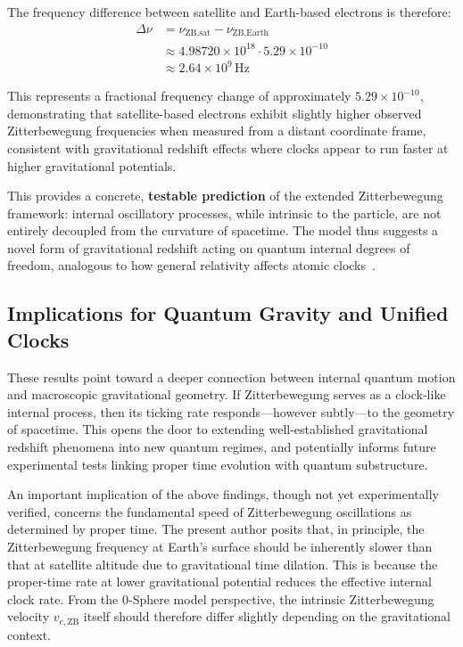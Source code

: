 \documentclass[%
 reprint,
 amsmath,amssymb,
 aps,
]{revtex4-1}
\numberwithin{equation}{section}%
\begin{document}
The frequency difference between satellite and Earth-based electrons is therefore:
\begin{equation}
\begin{aligned}
\Delta \nu &= \nu_{\text{ZB,sat}} - \nu_{\text{ZB,Earth}} \\
&\approx 4.98720 \times 10^{18} \cdot 5.29 \times 10^{-10} \\
&\approx 2.64 \times 10^{9} \, \text{Hz}
\end{aligned}
\end{equation}

This represents a fractional frequency change of approximately $5.29 \times 10^{-10}$, demonstrating that satellite-based electrons exhibit slightly higher observed Zitterbewegung frequencies when measured from a distant coordinate frame, consistent with gravitational redshift effects where clocks appear to run faster at higher gravitational potentials.

This provides a concrete, \textbf{testable prediction} of the extended Zitterbewegung framework: internal oscillatory processes, while intrinsic to the particle, are not entirely decoupled from the curvature of spacetime. The model thus suggests a novel form of gravitational redshift acting on quantum internal degrees of freedom, analogous to how general relativity affects atomic clocks~\cite{ludlow2015}.


\subsection{Implications for Quantum Gravity and Unified Clocks}

These results point toward a deeper connection between internal quantum motion and macroscopic gravitational geometry. If Zitterbewegung serves as a clock-like internal process, then its ticking rate responds—however subtly—to the geometry of spacetime. This opens the door to extending well-established gravitational redshift phenomena into new quantum regimes, and potentially informs future experimental tests linking proper time evolution with quantum substructure.

An important implication of the above findings, though not yet experimentally verified, concerns the fundamental speed of Zitterbewegung oscillations as determined by proper time. The present author posits that, in principle, the Zitterbewegung frequency at Earth's surface should be inherently slower than that at satellite altitude due to gravitational time dilation. This is because the proper-time rate at lower gravitational potential reduces the effective internal clock rate. From the 0-Sphere model perspective, the intrinsic Zitterbewegung velocity $v_{e,\text{ZB}}$ itself should therefore differ slightly depending on the gravitational context.
\end{document}
